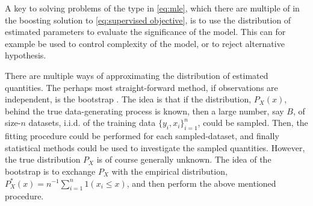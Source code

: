 
A key to solving problems of the type in \eqref{eq:mle}, which there are multiple of in the boosting solution to \eqref{eq:supervised objective}, is to use the distribution of estimated parameters to evaluate the significance of the model.
This can for example be used to control complexity of the model, or to reject alternative hypothesis.

There are multiple ways of approximating the distribution of estimated quantities.
The perhaps most straight-forward method, if observations are independent, is the bootstrap \citep{efron1992bootstrap}.
The idea is that if the distribution, $P_X(x)$, behind the true data-generating process is known, then a large number, say $B$, of size-$n$ datasets, i.i.d. of the training data $\{y_i,x_i\}_{i=1}^n$, could be sampled.
Then, the fitting procedure could be performed for each sampled-dataset, and finally statistical methods could be used to investigate the sampled quantities.
However, the true distribution $P_X$ is of course generally unknown.
The idea of the bootstrap is to exchange $P_X$ with the empirical distribution, $P_X^*(x)=n^{-1}\sum_{i=1}^{n}1(x_i\leq x)$, and then perform the above mentioned procedure.

